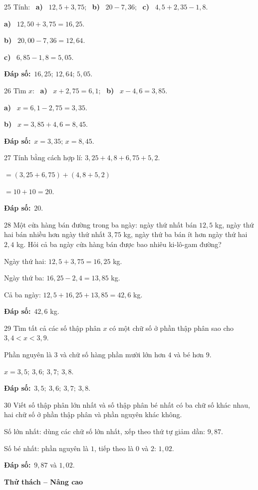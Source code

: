 \documentclass[11pt]{article}
\newif\ifsol \solfalse
\providecommand{\AnsWord}{Đáp số}
\newcommand{\dapso}[1]{\par\textbf{\AnsWord:}\ #1}
\newcommand{\probsol}[1]{%
  \begin{lrbox}{\solmeasure}\begin{minipage}{\dimexpr\linewidth-24pt\relax}#1\end{minipage}\end{lrbox}%
  \ifsol
    \begin{solbox}#1\end{solbox}%
  \else
    \setlength{\solht}{\dimexpr\ht\solmeasure+\dp\solmeasure+0.85cm\relax}%
    \ifdim\solht<1.35cm\setlength{\solht}{1.35cm}\fi
    \begin{tcolorbox}[colback=white,colframe=Line,boxrule=0.8pt,arc=5pt,
      left=8pt,right=8pt,top=4pt,bottom=4pt,height=\solht]{\footnotesize\color{Slate}\itshape\WorkWord}\end{tcolorbox}%
  \fi}
\newcommand{\dividerbar}[1]{\par\vspace{0.6em}\noindent
  \begin{tcolorbox}[enhanced,frame hidden,interior hidden,borderline west={5pt}{0pt}{ProbBlue},
    colback=white,left=12pt,right=12pt,top=5pt,bottom=5pt,arc=4pt]
  {\large\bfseries\color{ProbBlue} #1}\end{tcolorbox}\vspace{0.4em}}
\newcommand{\pa}[1]{\textbf{#1)}\ }
\newcommand{\gap}{\vspace{0.3cm}}
\def\WorkWord{Bài làm:}
\def\AnsWord{Đáp số}
\begin{document}
\gap
\begin{probbox}{25}{\relax}
Tính: \ \pa{a} $12{,}5+3{,}75$; \ \pa{b} $20-7{,}36$; \ \pa{c} $4{,}5+2{,}35-1{,}8$.
\end{probbox}
\probsol{
\pa{a} $12{,}50+3{,}75=16{,}25$.\par \pa{b} $20{,}00-7{,}36=12{,}64$.\par \pa{c} $6{,}85-1{,}8=5{,}05$.
\dapso{$16{,}25$; $12{,}64$; $5{,}05$.}}
\gap
\begin{probbox}{26}{\relax}
Tìm $x$: \ \pa{a} $x+2{,}75=6{,}1$; \ \pa{b} $x-4{,}6=3{,}85$.
\end{probbox}
\probsol{
\pa{a} $x=6{,}1-2{,}75=3{,}35$.\par \pa{b} $x=3{,}85+4{,}6=8{,}45$.
\dapso{$x=3{,}35$; $x=8{,}45$.}}
\gap
\begin{probbox}{27}{\relax}
Tính bằng cách hợp lí: $3{,}25+4{,}8+6{,}75+5{,}2$.
\end{probbox}
\probsol{
$=(3{,}25+6{,}75)+(4{,}8+5{,}2)$\par $=10+10=20$.
\dapso{$20$.}}
\gap
\begin{probbox}{28}{\relax}
Một cửa hàng bán đường trong ba ngày: ngày thứ nhất bán $12{,}5$ kg, ngày thứ hai bán nhiều hơn ngày thứ nhất $3{,}75$ kg, ngày thứ ba bán ít hơn ngày thứ hai $2{,}4$ kg. Hỏi cả ba ngày cửa hàng bán được bao nhiêu ki-lô-gam đường?
\end{probbox}
\probsol{
Ngày thứ hai: $12{,}5+3{,}75=16{,}25$ kg.\par Ngày thứ ba: $16{,}25-2{,}4=13{,}85$ kg.\par Cả ba ngày: $12{,}5+16{,}25+13{,}85=42{,}6$ kg.
\dapso{$42{,}6$ kg.}}
\gap
\begin{probbox}{29}{\relax}
Tìm tất cả các số thập phân $x$ có một chữ số ở phần thập phân sao cho $3{,}4<x<3{,}9$.
\end{probbox}
\probsol{
Phần nguyên là $3$ và chữ số hàng phần mười lớn hơn $4$ và bé hơn $9$.\par $x=3{,}5;\ 3{,}6;\ 3{,}7;\ 3{,}8$.
\dapso{$3{,}5;\ 3{,}6;\ 3{,}7;\ 3{,}8$.}}
\gap
\begin{probbox}{30}{\relax}
Viết số thập phân lớn nhất và số thập phân bé nhất có ba chữ số khác nhau, hai chữ số ở phần thập phân và phần nguyên khác không.
\end{probbox}
\probsol{
Số lớn nhất: dùng các chữ số lớn nhất, xếp theo thứ tự giảm dần: $9{,}87$.\par Số bé nhất: phần nguyên là $1$, tiếp theo là $0$ và $2$: $1{,}02$.
\dapso{$9{,}87$ và $1{,}02$.}}
\dividerbar{Thử thách -- Nâng cao}
\end{document}

